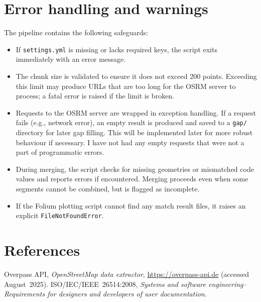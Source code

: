 \documentclass[11pt,a4paper]{article}
\begin{document}
\section{Error handling and warnings}
The pipeline contains the following safeguards:
\begin{itemize}
	\item If \texttt{settings.yml} is missing or lacks required keys, the script
	      exits immediately with an error message.
	\item The chunk size is validated to ensure it does not exceed 200 points.
	      Exceeding this limit may produce URLs that are too long for the OSRM
	      server to process; a fatal error is raised if the limit is broken.
	\item Requests to the OSRM server are wrapped in exception handling.  If a
	      request fails (e.g., network error), an empty result is produced and
	      saved to a \texttt{gap/} directory for later gap filling. This will be implemented
	      later for more robust behaviour if necessary. I have not had any empty requests
	      that were not a part of programmatic errors.
	\item During merging, the script checks for missing geometries or mismatched
	      code values and reports errors if encountered.  Merging proceeds even
	      when some segments cannot be combined, but is flagged as incomplete.
	\item If the Folium plotting script cannot find any match result files, it
	      raises an explicit \texttt{FileNotFoundError}.
\end{itemize}


\section*{References}
\begin{thebibliography}{9}
	 Overpass API, \emph{OpenStreetMap data extractor},
	\url{https://overpass-api.de} (accessed August~2025).
	 ISO/IEC/IEEE~26514:2008, \emph{Systems and software
		engineering--Requirements for designers and developers of user documentation}.
\end{thebibliography}
\end{document}
